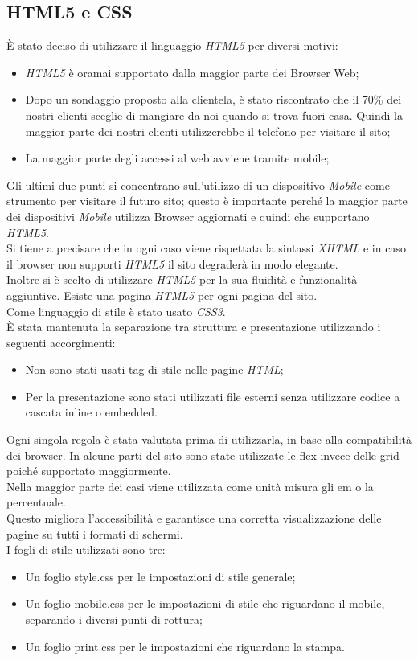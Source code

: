 \subsection{HTML5 e CSS}
È stato deciso di utilizzare il linguaggio \emph{HTML5} per diversi motivi:
\begin{itemize} %
	\item \emph{HTML5} è oramai supportato dalla maggior parte dei Browser Web;
	\item Dopo un sondaggio proposto alla clientela, è stato riscontrato che il 70\% dei nostri clienti sceglie di mangiare da noi quando si trova fuori casa. 
	Quindi la maggior parte dei nostri clienti utilizzerebbe il telefono per visitare il sito;
	\item La maggior parte degli accessi al web avviene tramite mobile;
\end{itemize}
Gli ultimi due punti si concentrano sull'utilizzo di un dispositivo \emph{Mobile} come strumento per visitare il futuro sito; questo è importante perché la maggior parte dei dispositivi \emph{Mobile} utilizza Browser aggiornati e quindi che supportano \emph{HTML5}.\\
Si tiene a precisare che in ogni caso viene rispettata la sintassi \emph{XHTML} e in caso il browser non supporti \emph{HTML5} il sito degraderà in modo elegante.\\
Inoltre si è scelto di utilizzare \emph{HTML5} per la sua fluidità e funzionalità aggiuntive. %
Esiste una pagina \emph{HTML5} per ogni pagina del sito.\\ %
Come linguaggio di stile è stato usato \emph{CSS3}.\\
È stata mantenuta la separazione tra struttura e presentazione utilizzando i seguenti accorgimenti: 
\begin{itemize}
    \item Non sono stati usati tag di stile nelle pagine \emph{HTML};
    \item Per la presentazione sono stati utilizzati file esterni senza utilizzare codice a cascata inline o embedded.
\end{itemize}
Ogni singola regola è stata valutata prima di utilizzarla, in base alla compatibilità dei browser.
In alcune parti del sito sono state utilizzate le flex invece delle grid poiché supportato maggiormente.\\
Nella maggior parte dei casi viene utilizzata come unità misura gli em o la percentuale.\\
Questo migliora l'accessibilità e garantisce una corretta visualizzazione delle pagine su tutti i formati di schermi.\\
I fogli di stile utilizzati sono tre:
\begin{itemize}
	\item Un foglio style.css per le impostazioni di stile generale;
	\item Un foglio mobile.css per le impostazioni di stile che riguardano il mobile, separando i diversi punti di rottura; %
	\item Un foglio print.css per le impostazioni che riguardano la stampa.
\end{itemize}